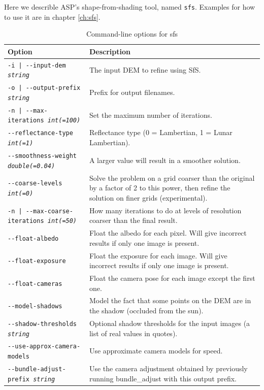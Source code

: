 Here we describle ASP's shape-from-shading tool, named
\texttt{sfs}. Examples for how to use it are in chapter \ref{ch:sfs}.

\begin{longtable}{|l|p{7.5cm}|}
\caption{Command-line options for sfs}
\label{tbl:sfs}
\endfirsthead
\endhead
\endfoot
\endlastfoot
\hline
Option & Description \\ \hline \hline
\texttt{-i | -\/-input-dem  \textit{string}} & The input DEM to refine using SfS.\\ \hline
\texttt{-o | -\/-output-prefix  \textit{string}} & Prefix for output filenames.\\ \hline
\texttt{-n | -\/-max-iterations \textit{int(=100)}} & Set the maximum number of iterations.\\ \hline
\texttt{-\/-reflectance-type \textit{int(=1)}} & Reflectance type (0 = Lambertian, 1 = Lunar Lambertian).\\ \hline
\texttt{-\/-smoothness-weight \textit{double(=0.04)}} & A larger value will result in a smoother solution.\\ \hline
\texttt{-\/-coarse-levels \textit{int(=0)}} & Solve the problem on a grid coarser than the original by a factor of 2 to this power, then refine the solution on finer grids (experimental).\\ \hline
\texttt{-n | -\/-max-coarse-iterations \textit{int(=50)}} & How many iterations to do at levels of resolution coarser than the final result.\\ \hline
\texttt{-\/-float-albedo} & Float the albedo for each pixel. Will give incorrect results if only one image is present.\\ \hline
\texttt{-\/-float-exposure} & Float the exposure for each image. Will give incorrect results if only one image is present.\\ \hline
\texttt{-\/-float-cameras} & Float the camera pose for each image except the first one.\\ \hline
\texttt{-\/-model-shadows} & Model the fact that some points on the DEM
are in the shadow (occluded from the sun).\\ \hline
\texttt{-\/-shadow-thresholds \textit{string}} & Optional shadow thresholds for the input images (a list of real values in quotes).\\ \hline
\texttt{-\/-use-approx-camera-models} & Use approximate camera models for speed.\\ \hline
\texttt{-\/-bundle-adjust-prefix \textit{string}} & Use the camera adjustment obtained by previously running bundle\_adjust with this output prefix.\\ \hline

\end{longtable}
